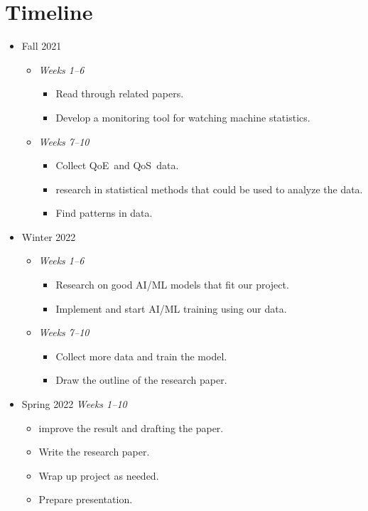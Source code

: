\section{Timeline}\label{timeline}
\begin{itemize}
    \item Fall 2021 \begin{itemize}
        \item \emph{Weeks 1--6} \begin{itemize}
            \item Read through related papers.
            \item Develop a monitoring tool for watching machine statistics.
        \end{itemize}
        \item \emph{Weeks 7--10} \begin{itemize}
            \item Collect QoE~and QoS~data.
            \item research in statistical methods that could be used to analyze the data.
            \item Find patterns in data.
        \end{itemize}
    \end{itemize}

    \item Winter 2022 \begin{itemize}
        \item \emph{Weeks 1--6} \begin{itemize}
            \item Research on good AI/ML models that fit our project.
            \item Implement and start AI/ML training using our data.
        \end{itemize}
        \item \emph{Weeks 7--10} \begin{itemize}
            \item Collect more data and train the model.
            \item Draw the outline of the research paper.
        \end{itemize}
    \end{itemize}
        

    \item Spring 2022
    \emph{Weeks 1--10} \begin{itemize}
        \item improve the result and drafting the paper.
        \item Write the research paper.
        \item Wrap up project as needed.
        \item Prepare presentation.
        
    \end{itemize}
\end{itemize}
